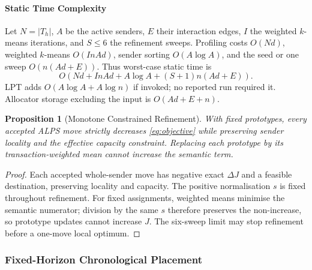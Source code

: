 \documentclass[conference,letterpaper]{IEEEtran}
\newtheorem{proposition}{Proposition}
\begin{document}
\paragraph{Static Time Complexity}
Let $N=|T_h|$, $A$ be the active senders, $E$ their interaction edges, $I$ the
weighted $k$-means iterations, and $S\leq6$ the refinement sweeps. Profiling
costs $O(Nd)$, weighted $k$-means $O(InAd)$, sender sorting $O(A\log A)$, and
the seed or one sweep $O(n(Ad+E))$. Thus worst-case static time is
\begin{equation}
\label{eq:static_complexity}
O\!\left(Nd + InAd + A\log A + (S+1)n(Ad+E)\right).
\end{equation}
LPT adds $O(A\log A+A\log n)$ if invoked; no reported run required it.
Allocator storage excluding the input is $O(Ad+E+n)$.

\begin{proposition}[Monotone Constrained Refinement]
With fixed prototypes, every accepted ALPS move strictly decreases
\eqref{eq:objective} while preserving sender locality and the effective
capacity constraint. Replacing each prototype by its transaction-weighted mean
cannot increase the semantic term.
\end{proposition}

\begin{proof}
Each accepted whole-sender move has negative exact $\Delta J$ and a feasible
destination, preserving locality and capacity. The positive normalisation $s$
is fixed throughout refinement. For fixed assignments, weighted means minimise
the semantic numerator; division by the same $s$ therefore preserves the
non-increase, so prototype updates cannot increase $J$.
The six-sweep limit may stop refinement before a one-move local optimum.
\end{proof}

\subsubsection{Fixed-Horizon Chronological Placement}
\end{document}
